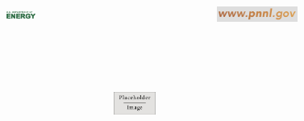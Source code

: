 \documentclass[final]{beamer}
\newlength{\sepwid}
\newlength{\onecolwid}
\begin{document}
\begin{frame}[t]
\begin{columns}[t]
    \begin{column}{\sepwid}
    \end{column} %
    \begin{column}{\onecolwid}
      \includegraphics[width=0.4\textwidth,left]{figure/doe.png}
    \end{column}
    \begin{column}{\sepwid}
    \end{column} %
    \begin{column}{\onecolwid}
        \includegraphics[width=0.6\textwidth,height=2.5in,left]{figure/placeholder.jpg}
    \end{column}
    \begin{column}{\sepwid}
    \end{column} %
    \begin{column}{\onecolwid}
      \includegraphics[width=0.5\textwidth,right]{figure/pnnl_web.png}
    \end{column}
    \begin{column}{\sepwid}
    \end{column} %
  \end{columns}
\end{frame} %
\end{document}
